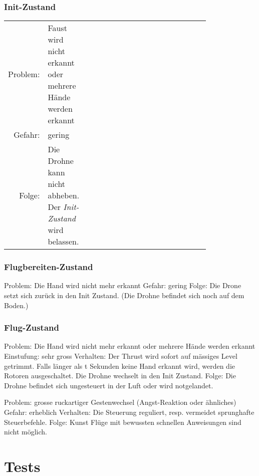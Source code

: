 \subsubsection{Init-Zustand}

\begin{center}
\small\renewcommand{\arraystretch}{1.4}
\begin{tabular}{|rp{0.2\linewidth}|lp{0.6\linewidth}|}
	\hline
	Problem: & Faust wird nicht erkannt oder mehrere Hände werden erkannt\\
	Gefahr: & gering\\
	Folge: & Die Drohne kann nicht abheben. Der \textit{Init-Zustand} wird belassen.\\
%
\end{tabular}
\end{center}



\subsubsection{Flugbereiten-Zustand}
Problem:        Die Hand wird nicht mehr erkannt
Gefahr:        gering
Folge:                Die Drone setzt sich zurück in den Init Zustand. (Die Drohne befindet sich noch auf dem Boden.)

\subsubsection{Flug-Zustand}
Problem:        Die Hand wird nicht mehr erkannt oder mehrere Hände werden erkannt
Einstufung:        sehr gross
Verhalten:        Der Thrust wird sofort auf mässiges Level getrimmt. Falls länger als t Sekunden keine Hand erkannt wird, werden die Rotoren ausgeschaltet. Die Drohne wechselt in den Init Zustand.
Folge:                Die Drohne befindet sich ungesteuert in der Luft oder wird notgelandet.

Problem:        grosse ruckartiger Gestenwechsel (Angst-Reaktion oder ähnliches)
Gefahr:        erheblich
Verhalten:        Die Steuerung reguliert, resp. vermeidet sprunghafte Steuerbefehle.
Folge:                Kunst Flüge mit bewussten schnellen Anweisungen sind nicht möglich.

\section{Tests}


